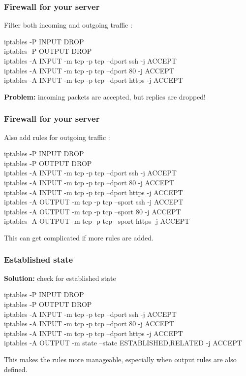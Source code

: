 \documentclass[14pt]{beamer}
\begin{document}
  \begin{frame}
    \frametitle{Firewall for your server}
    Filter both incoming and outgoing traffic :
    \begin{example}
      \small{iptables -P INPUT DROP\\
      iptables -P OUTPUT DROP\\
      iptables -A INPUT -m tcp -p tcp --dport ssh -j ACCEPT\\
      iptables -A INPUT -m tcp -p tcp --dport 80 -j ACCEPT\\
      iptables -A INPUT -m tcp -p tcp --dport https -j ACCEPT}
    \end{example}
    \pause
    \textbf{Problem:} incoming packets are accepted, but replies are dropped!
  \end{frame}
  \begin{frame}
    \frametitle{Firewall for your server}
    Also add rules for outgoing traffic :
    \begin{example}
      \small{iptables -P INPUT DROP\\
      iptables -P OUTPUT DROP\\
      iptables -A INPUT -m tcp -p tcp --dport ssh -j ACCEPT\\
      iptables -A INPUT -m tcp -p tcp --dport 80 -j ACCEPT\\
      iptables -A INPUT -m tcp -p tcp --dport https -j ACCEPT\\
      iptables -A OUTPUT -m tcp -p tcp --sport ssh -j ACCEPT\\
      iptables -A OUTPUT -m tcp -p tcp --sport 80 -j ACCEPT\\
      iptables -A OUTPUT -m tcp -p tcp --sport https -j ACCEPT}
    \end{example}
    \pause
    This can get complicated if more rules are added.
  \end{frame}
  \begin{frame}
    \frametitle{Established state}
    \textbf{Solution:} check for established state
    \begin{example}
      \small{iptables -P INPUT DROP\\
      iptables -P OUTPUT DROP\\
      iptables -A INPUT -m tcp -p tcp --dport ssh -j ACCEPT\\
      iptables -A INPUT -m tcp -p tcp --dport 80 -j ACCEPT\\
      iptables -A INPUT -m tcp -p tcp --dport https -j ACCEPT\\
      iptables -A OUTPUT -m state --state ESTABLISHED,RELATED -j ACCEPT}
    \end{example}
    This makes the rules more manageable, especially when output rules are also defined.
  \end{frame}
\end{document}
